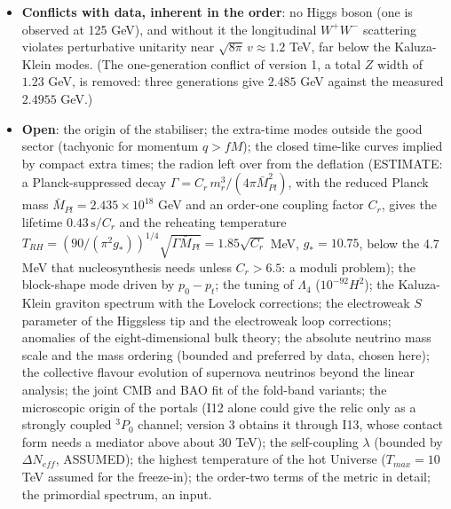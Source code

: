 \documentclass[
  10pt,
]{article}
\providecommand{\tightlist}{%
  \setlength{\itemsep}{0pt}\setlength{\parskip}{0pt}}
\begin{document}
\begin{itemize}
\tightlist
\item
  \textbf{Conflicts with data, inherent in the order}: no Higgs boson
  (one is observed at 125 GeV), and without it the longitudinal
  \(W^+W^-\) scattering violates perturbative unitarity near
  \(\sqrt{8\pi}\,v \approx 1.2\) TeV, far below the Kaluza-Klein modes.
  (The one-generation conflict of version 1, a total \(Z\) width of
  \(1.23\) GeV, is removed: three generations give \(2.485\) GeV against
  the measured \(2.4955\) GeV.)
\item
  \textbf{Open}: the origin of the stabiliser; the extra-time modes
  outside the good sector (tachyonic for momentum \(q > fM\)); the
  closed time-like curves implied by compact extra times; the radion
  left over from the deflation (ESTIMATE: a Planck-suppressed decay
  \(\Gamma = C_r\,m_r^3/(4\pi\bar M_{Pl}^2)\), with the reduced Planck
  mass \(\bar M_{Pl} = 2.435\times10^{18}\) GeV and an order-one
  coupling factor \(C_r\), gives the lifetime \(0.43\,\text{s}/C_r\) and
  the reheating temperature
  \(T_{RH} = (90/(\pi^2g_*))^{1/4}\sqrt{\Gamma\bar M_{Pl}} = 1.85\sqrt{C_r}\)
  MeV, \(g_* = 10.75\), below the 4.7 MeV that nucleosynthesis needs
  unless \(C_r > 6.5\): a moduli problem); the block-shape mode driven
  by \(p_0 - p_t\); the tuning of \(\Lambda_4\) (\(10^{-92}H^2\)); the
  Kaluza-Klein graviton spectrum with the Lovelock corrections; the
  electroweak \(S\) parameter of the Higgsless tip and the electroweak
  loop corrections; anomalies of the eight-dimensional bulk theory; the
  absolute neutrino mass scale and the mass ordering (bounded and
  preferred by data, chosen here); the collective flavour evolution of
  supernova neutrinos beyond the linear analysis; the joint CMB and BAO
  fit of the fold-band variants; the microscopic origin of the portals
  (I12 alone could give the relic only as a strongly coupled \(^3P_0\)
  channel; version 3 obtains it through I13, whose contact form needs a
  mediator above about 30 TeV); the self-coupling \(\lambda\) (bounded
  by \(\Delta N_{eff}\), ASSUMED); the highest temperature of the hot
  Universe (\(T_{max} = 10\) TeV assumed for the freeze-in); the
  order-two terms of the metric in detail; the primordial spectrum, an
  input.
\end{itemize}
\end{document}
